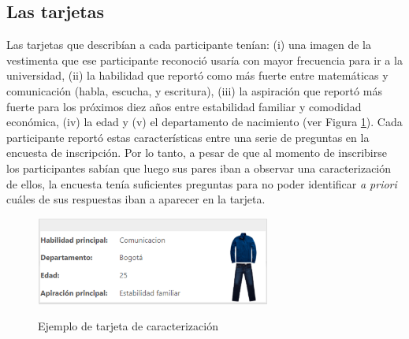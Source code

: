 \subsection{Las tarjetas}
Las tarjetas que describían a cada participante tenían: (i) una imagen de la vestimenta que ese participante reconoció usaría con mayor frecuencia para ir a la universidad, (ii) la habilidad que reportó como más fuerte entre matemáticas y comunicación (habla, escucha, y escritura), (iii) la aspiración que reportó más fuerte para los próximos diez años entre estabilidad familiar y comodidad económica, (iv) la edad y (v) el departamento de nacimiento (ver Figura \ref{fig:tarjeta}). Cada participante reportó estas características entre una serie de preguntas en la encuesta de inscripción. Por lo tanto, a pesar de que al momento de inscribirse los participantes sabían que luego sus pares iban a observar una caracterización de ellos, la encuesta tenía suficientes preguntas para no poder identificar \textit{a priori} cuáles de sus respuestas iban a aparecer en la tarjeta. 

\begin{figure}[htbp]
	\centering
	\caption{Ejemplo de tarjeta de caracterización}
	\includegraphics[width=7.7cm]{Images/tarjeta}
	\label{fig:tarjeta}
\end{figure}

